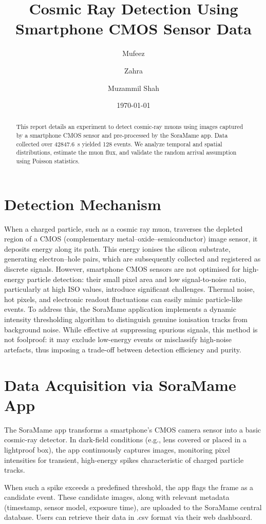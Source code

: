 \documentclass[12pt]{article}
\title{\textbf{Cosmic Ray Detection Using Smartphone CMOS Sensor Data}}
\author[]{Mufeez}
\author[]{Zahra}
\author[]{Muzammil Shah}
\affil[]{Department of Physics, Quaid-i-Azam University}
\date{\today}
\begin{document}
	\maketitle	
	
	\begin{abstract}
		This report details an experiment to detect cosmic-ray muons using images captured by a smartphone CMOS sensor and pre-processed by the SoraMame app. Data collected over \SI{42847.6}{\second} yielded \num{128} events. We analyze temporal and spatial distributions, estimate the muon flux, and validate the random arrival assumption using Poisson statistics.
	\end{abstract}
	

	\section{Detection Mechanism}
	When a charged particle, such as a cosmic ray muon, traverses the depleted region of a CMOS (complementary metal–oxide–semiconductor) image sensor, it deposits energy along its path. This energy ionises the silicon substrate, generating electron–hole pairs, which are subsequently collected and registered as discrete signals. However, smartphone CMOS sensors are not optimised for high-energy particle detection: their small pixel area and low signal-to-noise ratio, particularly at high ISO values, introduce significant challenges. Thermal noise, hot pixels, and electronic readout fluctuations can easily mimic particle-like events. To address this, the SoraMame application implements a dynamic intensity thresholding algorithm to distinguish genuine ionisation tracks from background noise. While effective at suppressing spurious signals, this method is not foolproof: it may exclude low-energy events or misclassify high-noise artefacts, thus imposing a trade-off between detection efficiency and purity.
	
	\section{Data Acquisition via SoraMame App}
	
	The SoraMame app transforms a smartphone's CMOS camera sensor into a basic cosmic-ray detector. In dark-field conditions (e.g., lens covered or placed in a lightproof box), the app continuously captures images, monitoring pixel intensities for transient, high-energy spikes characteristic of charged particle tracks.
	
	When such a spike exceeds a predefined threshold, the app flags the frame as a candidate event. These candidate images, along with relevant metadata (timestamp, sensor model, exposure time), are uploaded to the SoraMame central database. Users can retrieve their data in .csv format via their web dashboard.
	
\end{document}
